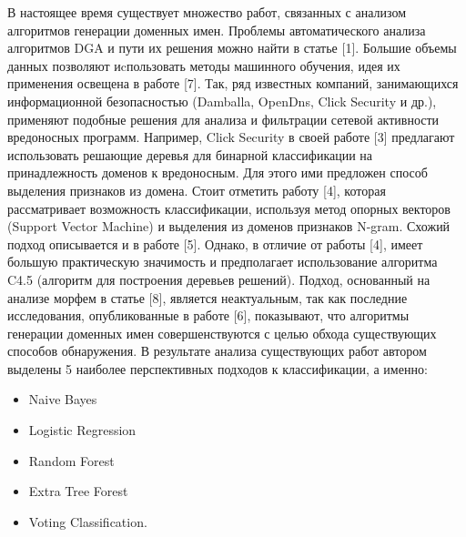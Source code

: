 В настоящее время существует множество работ, связанных с анализом алгоритмов генерации доменных имен. Проблемы автоматического анализа алгоритмов DGA и пути их решения можно найти в статье [1]. Большие объемы данных позволяют иcпользовать методы машинного обучения, идея их применения освещена в работе [7]. Так, ряд известных компаний, занимающихся информационной безопасностью (Damballa, OpenDns, Click Security и др.), применяют подобные решения для анализа и фильтрации сетевой активности вредоносных программ. Например, Click Security в своей работе [3] предлагают использовать решающие деревья для бинарной классификации на принадлежность доменов к вредоносным. Для этого ими предложен способ выделения признаков из домена. Стоит отметить работу [4], которая рассматривает возможность классификации, используя метод опорных векторов (Support Vector Machine) и выделения из доменов признаков N-gram. Схожий подход описывается и в работе [5]. Однако, в отличие от работы [4], имеет большую практическую значимость и предполагает использование алгоритма C4.5 (алгоритм для построения деревьев решений). Подход, основанный на анализе морфем в статье [8], является неактуальным, так как последние исследования, опубликованные в работе [6], показывают, что алгоритмы генерации доменных имен совершенствуются с целью обхода существующих способов обнаружения. В результате анализа существующих работ автором выделены 5 наиболее перспективных подходов к классификации, а именно:
\begin{itemize}
\item Naive Bayes
\item Logistic Regression
\item Random Forest
\item Extra Tree Forest
\item Voting Classification.
\end{itemize}
\clearpage

